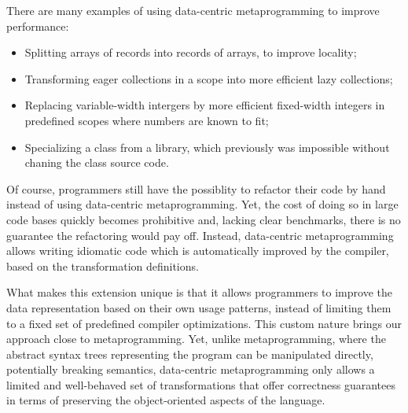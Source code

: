 There are many examples of using data-centric metaprogramming to improve performance:
\begin{itemize}
  \item Splitting arrays of records into records of arrays, to improve locality;
  \item Transforming eager collections in a scope into more efficient lazy collections;
  \item Replacing variable-width intergers by more efficient fixed-width integers in predefined scopes where numbers are known to fit;
  \item Specializing a class from a library, which previously was impossible without chaning the class source code.
\end{itemize}

Of course, programmers still have the possiblity to refactor their code by hand instead of using data-centric metaprogramming. Yet, the cost of doing so in large code bases quickly becomes prohibitive and, lacking clear benchmarks, there is no guarantee the refactoring would pay off. Instead, data-centric metaprogramming allows writing idiomatic code which is automatically improved by the compiler, based on the transformation definitions.

What makes this extension unique is that it allows programmers to improve the data representation based on their own usage patterns, instead of limiting them to a fixed set of predefined compiler optimizations. This custom nature brings our approach close to metaprogramming. Yet, unlike metaprogramming, where the abstract syntax trees representing the program can be manipulated directly, potentially breaking semantics, data-centric metaprogramming only allows a limited and well-behaved set of transformations that offer correctness guarantees in terms of preserving the object-oriented aspects of the language.

%
%

